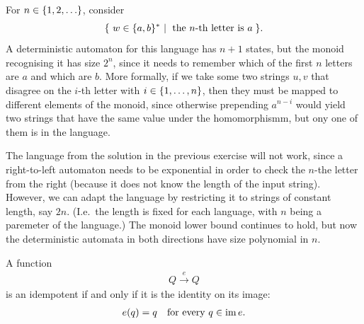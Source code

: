  { 
For $n \in \{1,2,\ldots\}$, consider
\begin{align*}
\setbuild{ w \in \set{a,b}^*}{the $n$-th letter is $a$}.
\end{align*}
A deterministic automaton for this language has $n+1$ states, but the monoid recognising it has size $2^n$, since it needs to remember which of the first $n$ letters are $a$ and which are $b$. More formally, if we take some two strings $u,v$ that disagree on the $i$-th letter with $i \in \{1,\ldots,n\}$, then they must be mapped to different elements of the monoid, since otherwise prepending $a^{n-i}$ would yield two strings that have the same value under the homomorphismm, but  ony one of them is  in the language.
}

 { The language from the solution in the previous exercise will not work, since a right-to-left automaton needs to be exponential in order to check the $n$-the letter from the right (because it does not know the length of the input string). However, we can adapt the language by restricting it to  strings of constant length, say $2n$. (I.e.~the length is fixed for each language, with $n$ being a paremeter of the language.) The monoid lower bound continues to hold, but now the deterministic automata in both directions have size polynomial in $n$. 
 }


 { 
A function 
\begin{align*}
Q \xrightarrow e Q
\end{align*}
is an idempotent if and only if it is the identity on its image:
\begin{align*}
e(q) = q \quad \text{for every }q \in \operatorname{\mathrm{im}} e.
\end{align*}
}

